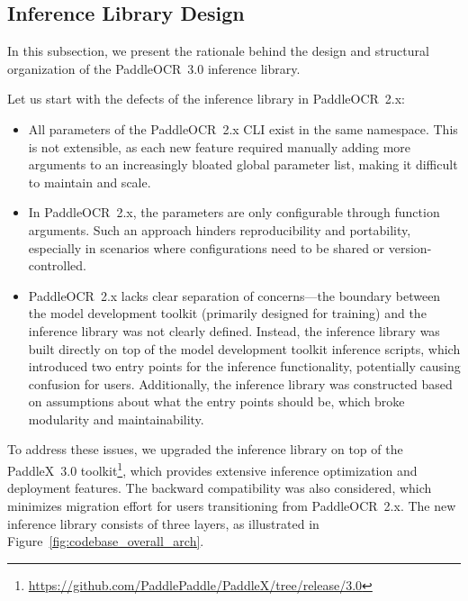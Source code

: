 \documentclass[11pt, a4paper, logo, copyright, nonumbering]{paddleocr}
\begin{document}
\subsection{Inference Library Design}

In this subsection, we present the rationale behind the design and structural organization of the PaddleOCR~3.0 inference library.

Let us start with the defects of the inference library in PaddleOCR~2.x:

\begin{itemize}
    \item All parameters of the PaddleOCR~2.x CLI exist in the same namespace. This is not extensible, as each new feature required manually adding more arguments to an increasingly bloated global parameter list, making it difficult to maintain and scale.
    
    \item In PaddleOCR~2.x, the parameters are only configurable through function arguments. Such an approach hinders reproducibility and portability, especially in scenarios where configurations need to be shared or version-controlled.
    
    \item PaddleOCR~2.x lacks clear separation of concerns---the boundary between the model development toolkit (primarily designed for training) and the inference library was not clearly defined. Instead, the inference library was built directly on top of the model development toolkit inference scripts, which introduced two entry points for the inference functionality, potentially causing confusion for users. Additionally, the inference library was constructed based on assumptions about what the entry points should be, which broke modularity and maintainability.
\end{itemize}

To address these issues, we upgraded the inference library on top of the PaddleX~3.0 toolkit\footnote{\label{paddlex3.0}\url{https://github.com/PaddlePaddle/PaddleX/tree/release/3.0}}, which provides extensive inference optimization and deployment features. The backward compatibility was also considered, which minimizes migration effort for users transitioning from PaddleOCR~2.x. The new inference library consists of three layers, as illustrated in Figure~\ref{fig:codebase_overall_arch}.
\end{document}
